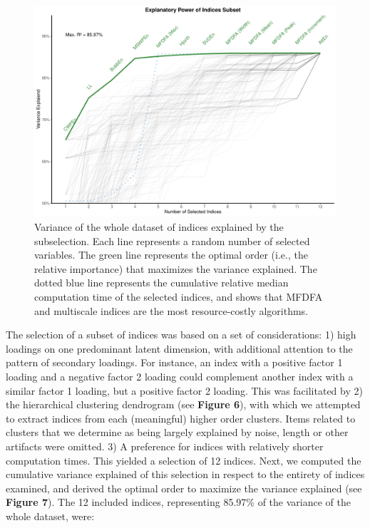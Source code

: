 \documentclass[
  man]{apa6}
\begin{document}
\begin{figure}
\centering
\includegraphics{./figures/varexplained-1.pdf}
\caption{\label{fig:varexplained}Variance of the whole dataset of indices explained by the subselection. Each line represents a random number of selected variables. The green line represents the optimal order (i.e., the relative importance) that maximizes the variance explained. The dotted blue line represents the cumulative relative median computation time of the selected indices, and shows that MFDFA and multiscale indices are the most resource-costly algorithms.}
\end{figure}

The selection of a subset of indices was based on a set of considerations: 1) high loadings on one predominant latent dimension, with additional attention to the pattern of secondary loadings. For instance, an index with a positive factor 1 loading and a negative factor 2 loading could complement another index with a similar factor 1 loading, but a positive factor 2 loading. This was facilitated by 2) the hierarchical clustering dendrogram (see \textbf{Figure 6}), with which we attempted to extract indices from each (meaningful) higher order clusters. Items related to clusters that we determine as being largely explained by noise, length or other artifacts were omitted. 3) A preference for indices with relatively shorter computation times. This yielded a selection of 12 indices. Next, we computed the cumulative variance explained of this selection in respect to the entirety of indices examined, and derived the optimal order to maximize the variance explained (see \textbf{Figure 7}). The 12 included indices, representing 85.97\% of the variance of the whole dataset, were:
\end{document}
